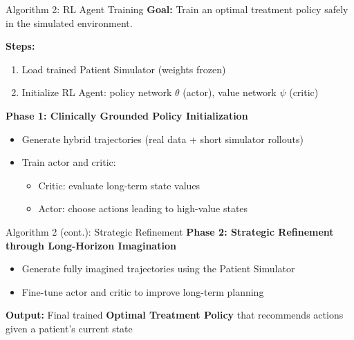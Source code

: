 \documentclass[11pt]{beamer}
\begin{document}
\begin{frame}{Algorithm 2: RL Agent Training}
\textbf{Goal:} Train an optimal treatment policy safely in the simulated environment.

\textbf{Steps:}
\begin{enumerate}
    \item Load trained Patient Simulator (weights frozen)
    \item Initialize RL Agent: policy network $\theta$ (actor), value network $\psi$ (critic)
\end{enumerate}

\textbf{Phase 1: Clinically Grounded Policy Initialization}  
\begin{itemize}
    \item Generate hybrid trajectories (real data + short simulator rollouts)
    \item Train actor and critic:
    \begin{itemize}
        \item Critic: evaluate long-term state values
        \item Actor: choose actions leading to high-value states
    \end{itemize}
\end{itemize}
\end{frame}

\begin{frame}{Algorithm 2 (cont.): Strategic Refinement}
\textbf{Phase 2: Strategic Refinement through Long-Horizon Imagination}  
\begin{itemize}
    \item Generate fully imagined trajectories using the Patient Simulator
    \item Fine-tune actor and critic to improve long-term planning
\end{itemize}

\textbf{Output:} Final trained \textbf{Optimal Treatment Policy} that recommends actions given a patient’s current state
\end{frame}

\end{document}
